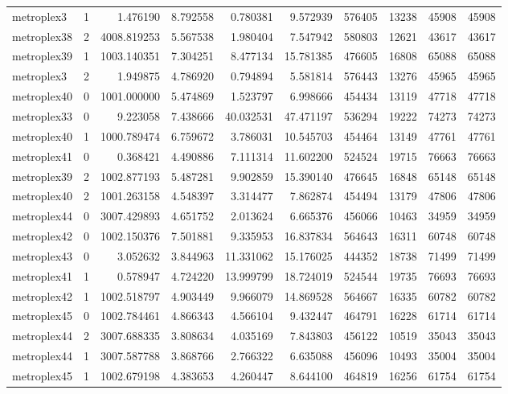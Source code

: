 \begin{longtable}{|l|r|r|r|r|r|r|r|r|r|}
metroplex3 & 1 & 1.476190 & 8.792558 & 0.780381 & 9.572939 & 576405 & 13238 & 45908 & 45908 \\
metroplex38 & 2 & 4008.819253 & 5.567538 & 1.980404 & 7.547942 & 580803 & 12621 & 43617 & 43617 \\
metroplex39 & 1 & 1003.140351 & 7.304251 & 8.477134 & 15.781385 & 476605 & 16808 & 65088 & 65088 \\
metroplex3 & 2 & 1.949875 & 4.786920 & 0.794894 & 5.581814 & 576443 & 13276 & 45965 & 45965 \\
metroplex40 & 0 & 1001.000000 & 5.474869 & 1.523797 & 6.998666 & 454434 & 13119 & 47718 & 47718 \\
metroplex33 & 0 & 9.223058 & 7.438666 & 40.032531 & 47.471197 & 536294 & 19222 & 74273 & 74273 \\
metroplex40 & 1 & 1000.789474 & 6.759672 & 3.786031 & 10.545703 & 454464 & 13149 & 47761 & 47761 \\
metroplex41 & 0 & 0.368421 & 4.490886 & 7.111314 & 11.602200 & 524524 & 19715 & 76663 & 76663 \\
metroplex39 & 2 & 1002.877193 & 5.487281 & 9.902859 & 15.390140 & 476645 & 16848 & 65148 & 65148 \\
metroplex40 & 2 & 1001.263158 & 4.548397 & 3.314477 & 7.862874 & 454494 & 13179 & 47806 & 47806 \\
metroplex44 & 0 & 3007.429893 & 4.651752 & 2.013624 & 6.665376 & 456066 & 10463 & 34959 & 34959 \\
metroplex42 & 0 & 1002.150376 & 7.501881 & 9.335953 & 16.837834 & 564643 & 16311 & 60748 & 60748 \\
metroplex43 & 0 & 3.052632 & 3.844963 & 11.331062 & 15.176025 & 444352 & 18738 & 71499 & 71499 \\
metroplex41 & 1 & 0.578947 & 4.724220 & 13.999799 & 18.724019 & 524544 & 19735 & 76693 & 76693 \\
metroplex42 & 1 & 1002.518797 & 4.903449 & 9.966079 & 14.869528 & 564667 & 16335 & 60782 & 60782 \\
metroplex45 & 0 & 1002.784461 & 4.866343 & 4.566104 & 9.432447 & 464791 & 16228 & 61714 & 61714 \\
metroplex44 & 2 & 3007.688335 & 3.808634 & 4.035169 & 7.843803 & 456122 & 10519 & 35043 & 35043 \\
metroplex44 & 1 & 3007.587788 & 3.868766 & 2.766322 & 6.635088 & 456096 & 10493 & 35004 & 35004 \\
metroplex45 & 1 & 1002.679198 & 4.383653 & 4.260447 & 8.644100 & 464819 & 16256 & 61754 & 61754 \\

\end{longtable}
